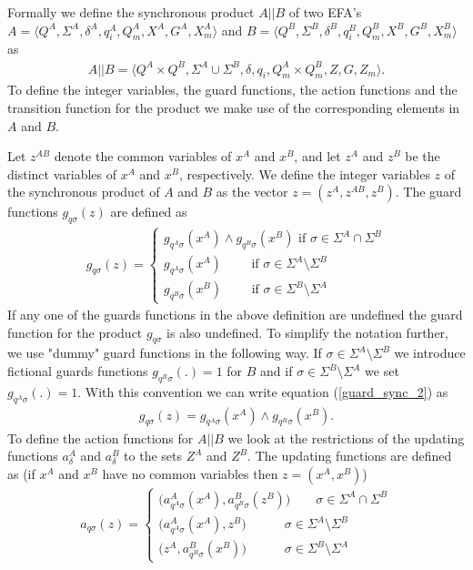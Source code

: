 \documentclass{article}
\begin{document}
Formally we define the synchronous product $A||B$ of two EFA's
$A=\langle Q^A, \Sigma^A, \delta^A, q^A_i, Q^A_m, X^{A}, G^A,X^A_m
\rangle$ and $B=\langle Q^B, \Sigma^B, \delta^B, q^B_i, Q^B_m,
X^{B}, G^B,X^B_m
 \rangle$ as
\begin{eqnarray}
A||B=\langle Q^A\times Q^B, \Sigma^A \cup \Sigma^B , \delta, q_i,
Q^A_m\times Q^B_m, Z, G, Z_m \rangle.
\end{eqnarray}
To define the integer variables, the guard functions, the action
functions and the transition function for the product we make use
of the corresponding elements in $A$ and $B$.

 Let $z^{AB}$ denote the common variables of $x^{A}$ and $x^{B}$, and let $z^A$
and $z^B$ be the distinct variables of $x^{A}$ and $x^{B}$,
respectively. We define the integer variables $z$ of the
synchronous product of $A$ and $B$ as the vector $z=(z^A, z^{AB},
z^B)$. The guard functions $g_{q \sigma}(z)$ are defined as
\begin{eqnarray}\label{guard_sync_2}
g_{q \sigma}(z)=\left\{
\begin{array}{ll}
g_{q^A\sigma}(x^{A})\wedge g_{q^B\sigma}(x^{B}) \textrm{ if }\sigma\in \Sigma^A \cap \Sigma^B\\
g_{q^A\sigma}(x^{A}) \quad\quad \textrm{ if } \sigma\in \Sigma^A \setminus \Sigma^B\\
g_{q^B\sigma}(x^{B}) \quad\quad \textrm{ if }
\sigma\in\Sigma^B\setminus \Sigma^A
\end{array}\right.
\end{eqnarray}
If any one of the guards functions in the above definition are
undefined the guard function for the product $g_{q \sigma}$ is
also undefined. To simplify the notation further, we use "dummy"
guard functions in the following way. If $\sigma\in \Sigma^A
\setminus \Sigma^B$ we introduce fictional guards functions
$g_{q^B\sigma}(.)=1$ for $B$ and if $\sigma\in\Sigma^B\setminus
\Sigma^A$ we set $g_{q^A\sigma}(.)=1$. With this convention we can
write equation (\ref{guard_sync_2}) as
\begin{eqnarray}
g_{q \sigma}(z)= g_{q^A\sigma}(x^{A})\wedge g_{q^B\sigma}(x^{B}).
\end{eqnarray}
To define the action functions for $A||B$ we look at the
restrictions of the updating functions $a^A_\delta$ and
$a^B_\delta$ to the sets $Z^A$ and $Z^B$. The updating functions
are defined as (if $x^{A}$ and $x^{B}$ have no common variables
then $z=(x^{A},x^{B})$)
\begin{eqnarray}\label{action_sync_2}
a_{q \sigma}(z)=\left\{
\begin{array}{ll}
 \big(a^A_{q^A \sigma}(x^{A}), a^B_{q^B \sigma}(z^{B})\big)\quad\quad\sigma\in \Sigma^A \cap \Sigma^B\\
\big(a^A_{q^A \sigma}(x^{A}), z^{B}\big)\quad\quad\quad\sigma\in \Sigma^A \setminus \Sigma^B\\
\big(z^{A}, a^B_{q^B \sigma}(x^{B})\big)\quad\quad\quad\sigma\in
\Sigma^B \setminus \Sigma^A
\end{array}\right.
\end{eqnarray}
\end{document}
